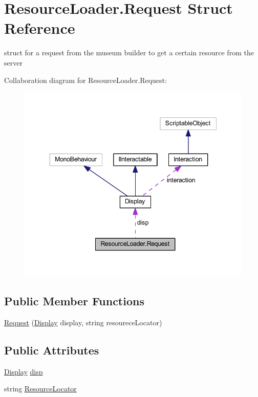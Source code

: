 \hypertarget{struct_resource_loader_1_1_request}{}\section{Resource\+Loader.\+Request Struct Reference}
\label{struct_resource_loader_1_1_request}


struct for a request from the museum builder to get a certain resource from the server  




Collaboration diagram for Resource\+Loader.\+Request\+:
\nopagebreak
\begin{figure}[H]
\begin{center}
\leavevmode
\includegraphics[width=344pt]{struct_resource_loader_1_1_request__coll__graph}
\end{center}
\end{figure}
\subsection*{Public Member Functions}
\begin{DoxyCompactItemize}
\item 
\mbox{\hyperlink{struct_resource_loader_1_1_request_a3427794aa15130e022643f9a89a8b433}{Request}} (\mbox{\hyperlink{class_display}{Display}} display, string resourece\+Locator)
\end{DoxyCompactItemize}
\subsection*{Public Attributes}
\begin{DoxyCompactItemize}
\item 
\mbox{\hyperlink{class_display}{Display}} \mbox{\hyperlink{struct_resource_loader_1_1_request_ae29b4b250dc743adb48015484cf31697}{disp}}
\item 
string \mbox{\hyperlink{struct_resource_loader_1_1_request_aa5c217683710db8ab1f700365acb8d19}{Resource\+Locator}}
\end{DoxyCompactItemize}


